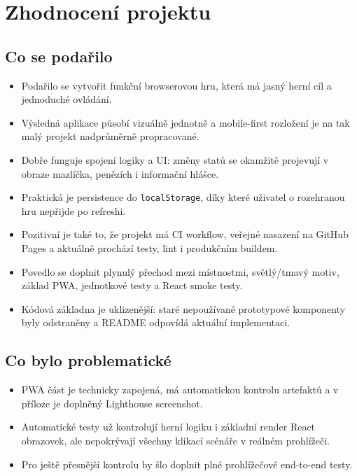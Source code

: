 \documentclass[12pt,a4paper]{article}
\begin{document}
\section{Zhodnocení projektu}

\subsection*{Co se podařilo}

\begin{itemize}[leftmargin=2em]
  \item Podařilo se vytvořit funkční browserovou hru, která má jasný herní cíl a jednoduché ovládání.
  \item Výsledná aplikace působí vizuálně jednotně a mobile-first rozložení je na tak malý projekt nadprůměrně propracované.
  \item Dobře funguje spojení logiky a UI: změny statů se okamžitě projevují v obraze mazlíčka, penězích i informační hlášce.
  \item Praktická je persistence do \texttt{localStorage}, díky které uživatel o rozehranou hru nepřijde po refreshi.
  \item Pozitivní je také to, že projekt má CI workflow, veřejné nasazení na GitHub Pages a aktuálně prochází testy, lint i produkčním buildem.
  \item Povedlo se doplnit plynulý přechod mezi místnostmi, světlý/tmavý motiv, základ PWA, jednotkové testy a React smoke testy.
  \item Kódová základna je uklizenější: staré nepoužívané prototypové komponenty byly odstraněny a README odpovídá aktuální implementaci.
\end{itemize}

\subsection*{Co bylo problematické}

\begin{itemize}[leftmargin=2em]
  \item PWA část je technicky zapojená, má automatickou kontrolu artefaktů a v příloze je doplněný Lighthouse screenshot.
  \item Automatické testy už kontrolují herní logiku i základní render React obrazovek, ale nepokrývají všechny klikací scénáře v reálném prohlížeči.
  \item Pro ještě přesnější kontrolu by šlo doplnit plné prohlížečové end-to-end testy.
\end{itemize}
\end{document}
